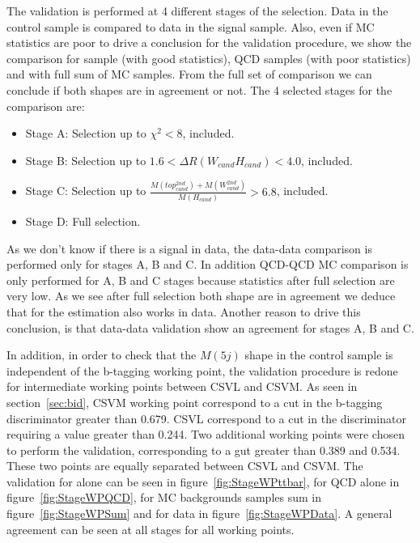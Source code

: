The validation is performed at 4 different stages of the selection. Data in the control sample is compared to data in the signal sample. Also, even if MC statistics are poor to drive a conclusion for the validation procedure, we show the comparison for \ttbar sample (with good statistics), QCD samples (with poor statistics) and with full sum of MC samples. From the full set of comparison we can conclude if both shapes are in agreement or not. The 4 selected stages for the comparison are:
\begin{itemize}
\item Stage A: Selection up to $\chi^{2}<8$, included.
\item Stage B: Selection up to $1.6<\Delta R (W_{cand} H_{cand})<4.0$, included.
\item Stage C: Selection up to $\frac{M(top^{2nd}_{cand})+M(W^{2nd}_{cand})}{M(H_{cand})}>6.8$, included.
\item Stage D: Full selection.
\end{itemize}

As we don't know if there is a signal in data, the data-data comparison is performed only for stages A, B and C. In addition QCD-QCD MC comparison is only performed for A, B and C stages because statistics after full selection are very low. As we see after full selection both shape are in agreement we deduce that for the estimation also works in data. Another reason to drive this conclusion, is that data-data validation show an agreement for stages A, B and C.

In addition, in order to check that the $M(5j)$ shape in the control sample is independent of the b-tagging working point, the validation procedure is redone for intermediate working points between CSVL and CSVM. As seen in section~\ref{sec:bid}, CSVM working point correspond to a cut in the b-tagging discriminator greater than 0.679. CSVL correspond to a cut in the discriminator requiring a value greater than 0.244. Two additional working points were chosen to perform the validation, corresponding to a gut greater than 0.389 and 0.534. These two points are equally separated between CSVL and CSVM. The validation for \ttbar alone can be seen in figure~\ref{fig:StageWPttbar}, for QCD alone in figure~\ref{fig:StageWPQCD}, for MC backgrounds samples sum in figure~\ref{fig:StageWPSum} and for data in figure~\ref{fig:StageWPData}. A general agreement can be seen at all stages for all working points.

